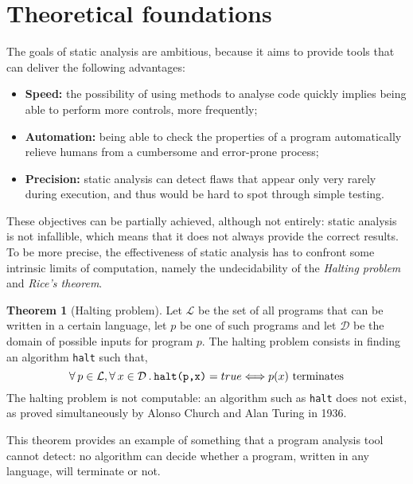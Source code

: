 \documentclass[target=mst,aauheader=aics]{thud}
\newcommand{\st}{\hspace{2px}.\hspace{2px}}
\theoremstyle{definition}
\begin{document}
	\section{Theoretical foundations}
	The goals of static analysis are ambitious, because it aims to provide tools that can deliver the following advantages:
	\begin{itemize}
		\item \textbf{Speed:} the possibility of using methods to analyse code quickly implies being able to perform more controls, more frequently; 
		\item \textbf{Automation:} being able to check the properties of a program automatically relieve humans from a cumbersome and error-prone process;
		\item \textbf{Precision:} static analysis can detect flaws that appear only very rarely during execution, and thus would be hard to spot through simple testing.
	\end{itemize}
	These objectives can be partially achieved, although not entirely:  static analysis is not infallible, which means that it does not always provide the correct results. To be more precise, the effectiveness of static analysis has to confront some intrinsic limits of computation, namely the undecidability of the \textit{Halting problem} and \textit{Rice's theorem}. 
	\theoremstyle{theorem}
	\newtheorem{thm}{Theorem}
	\begin{thm}[Halting problem] Let $\mathcal{L}$ be the set of all programs that can be written in a certain language, let $p$ be one of such programs and let $\mathcal{D}$ be the domain of possible inputs for program $p$. The halting problem consists in finding an algorithm \texttt{halt} such that,  
		\[
		\forall\hspace{2px}p\in\mathcal{L}, \forall\hspace{2px}x \in \mathcal{D}\st\texttt{halt(p,x)} = true \Longleftrightarrow p(x)\text{ terminates}
		\]
		The halting problem is not computable: an algorithm such as \texttt{halt} does not exist, as proved simultaneously by Alonso Church \cite{Church1936} and Alan Turing \cite{Turing1937} in 1936.
	\end{thm}
	This theorem provides an example of something that a program analysis tool cannot detect: no algorithm can decide whether a program, written in any language, will terminate or not.
	
\end{document}
